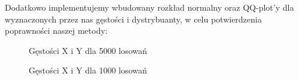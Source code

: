 \documentclass{article}
\begin{document}
\begin{enumerate}
		Dodatkowo implementujemy wbudowany rozkład normalny oraz QQ-plot'y dla wyznaczonych przez nas gęstości i dystrybuanty, w celu potwierdzenia poprawności naszej metody:
		\begin{figure}[h]
			\begin{center}
				\caption{Gęstości X i Y dla 5000 losowań}
			\end{center}
		\end{figure}
	
		\begin{figure}[h]
			\begin{center}
				\caption{Gęstości X i Y dla 1000 losowań}
			\end{center}
		\end{figure}
	

\end{enumerate}
\end{document}
